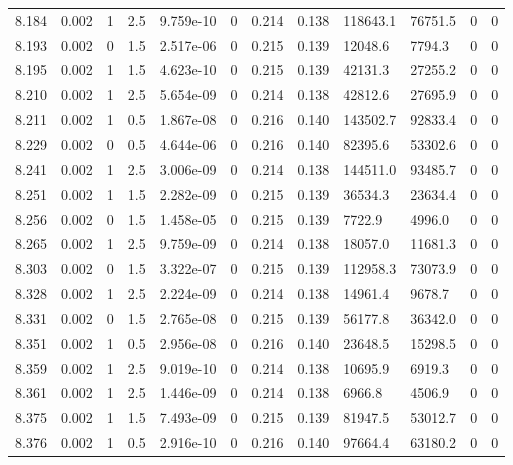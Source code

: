 \documentclass[preview]{standalone}
\begin{document}
{{{{{{{{{{{{{{\begin{tabular}{L{1.2cm}C{1.2cm} C{0.3cm}C{0.5cm} C{1.4cm}C{1.4cm} C{1.4cm}C{1.4cm} C{1.6cm}C{1.6cm} C{1.6cm}C{1.6cm}}
  8.184  &  0.002  & 1     & 2.5 &  9.759e-10  & 0  &  0.214&   0.138& 118643.1 & 76751.5   &  0 & 0  \\ 
  8.193  &  0.002  & 0     & 1.5 &  2.517e-06  & 0  &  0.215&   0.139& 12048.6 & 7794.3   &  0 & 0  \\ 
  8.195  &  0.002  & 1     & 1.5 &  4.623e-10  & 0  &  0.215&   0.139& 42131.3 & 27255.2   &  0 & 0  \\ 
  8.210  &  0.002  & 1     & 2.5 &  5.654e-09  & 0  &  0.214&   0.138& 42812.6 & 27695.9   &  0 & 0  \\ 
  8.211  &  0.002  & 1     & 0.5 &  1.867e-08  & 0  &  0.216&   0.140& 143502.7 & 92833.4   &  0 & 0  \\ 
  8.229  &  0.002  & 0     & 0.5 &  4.644e-06  & 0  &  0.216&   0.140& 82395.6 & 53302.6   &  0 & 0  \\ 
  8.241  &  0.002  & 1     & 2.5 &  3.006e-09  & 0  &  0.214&   0.138& 144511.0 & 93485.7   &  0 & 0  \\ 
  8.251  &  0.002  & 1     & 1.5 &  2.282e-09  & 0  &  0.215&   0.139& 36534.3 & 23634.4   &  0 & 0  \\ 
  8.256  &  0.002  & 0     & 1.5 &  1.458e-05  & 0  &  0.215&   0.139& 7722.9 & 4996.0   &  0 & 0  \\ 
  8.265  &  0.002  & 1     & 2.5 &  9.759e-09  & 0  &  0.214&   0.138& 18057.0 & 11681.3   &  0 & 0  \\ 
  8.303  &  0.002  & 0     & 1.5 &  3.322e-07  & 0  &  0.215&   0.139& 112958.3 & 73073.9   &  0 & 0  \\ 
  8.328  &  0.002  & 1     & 2.5 &  2.224e-09  & 0  &  0.214&   0.138& 14961.4 & 9678.7   &  0 & 0  \\ 
  8.331  &  0.002  & 0     & 1.5 &  2.765e-08  & 0  &  0.215&   0.139& 56177.8 & 36342.0   &  0 & 0  \\ 
  8.351  &  0.002  & 1     & 0.5 &  2.956e-08  & 0  &  0.216&   0.140& 23648.5 & 15298.5   &  0 & 0  \\ 
  8.359  &  0.002  & 1     & 2.5 &  9.019e-10  & 0  &  0.214&   0.138& 10695.9 & 6919.3   &  0 & 0  \\ 
  8.361  &  0.002  & 1     & 2.5 &  1.446e-09  & 0  &  0.214&   0.138& 6966.8 & 4506.9   &  0 & 0  \\ 
  8.375  &  0.002  & 1     & 1.5 &  7.493e-09  & 0  &  0.215&   0.139& 81947.5 & 53012.7   &  0 & 0  \\ 
  8.376  &  0.002  & 1     & 0.5 &  2.916e-10  & 0  &  0.216&   0.140& 97664.4 & 63180.2   &  0 & 0  \\ 

\end{tabular}}}}}}}}}}}}}}}
\end{document}
